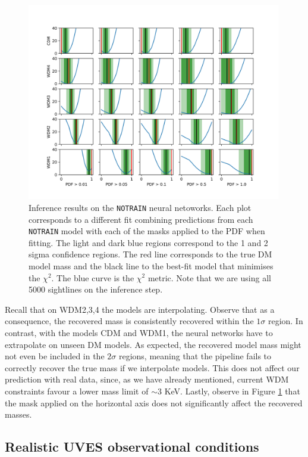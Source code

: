 \begin{figure}
    \centering
    \includegraphics[width=0.99\textwidth]{img/ML/inference_no_train.png}
    \caption{Inference results on the \texttt{NOTRAIN} neural netoworks. Each plot corresponds to a different fit combining predictions from each \texttt{NOTRAIN} model with each of the masks applied to the PDF when fitting. The light and dark blue regions correspond to the 1 and 2 sigma confidence regions. The red line corresponds to the true DM model mass and the black line to the best-fit model that minimises the $\chi^2$. The blue curve is the $\chi^2$ metric. Note that we are using all 5000 sightlines on the inference step.}
    \label{fig:inference no train}
\end{figure}
Recall that on WDM2,3,4 the models are interpolating. Observe that as a consequence, the recovered mass is consistently recovered within the $1\sigma$ region. In contrast, with the models CDM and WDM1, the neural networks have to extrapolate on unseen DM models. As expected, the recovered model mass might not even be included in the $2\sigma$ regions, meaning that the pipeline fails to correctly recover the true mass if we interpolate models. This does not affect our prediction with real data, since, as we have already mentioned, current WDM constraints favour a lower mass limit of $\sim 3$ KeV. Lastly, observe in Figure \ref{fig:inference no train} that the mask applied on the horizontal axis does not significantly affect the recovered masses.


\subsection{Realistic UVES observational conditions}\label{sec:hires test}

